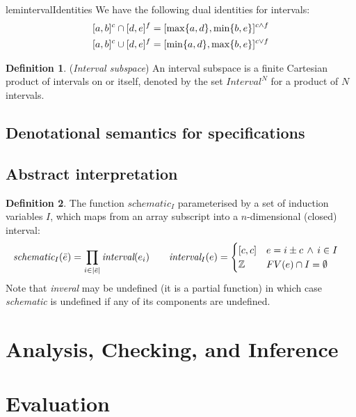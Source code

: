 \documentclass[acmlarge,review,anonymous]{acmart}\settopmatter{printfolios=true}
\theoremstyle{definition}
\newtheorem{defn}{Definition}
\theoremstyle{plain}
\begin{document}
\begin{restatable}{lem}{intervalIdentities}
 \label{lem:interval-identities}
  We have the following dual identities for \bz{} intervals:
%
  \begin{align*}
    \textnormal{$\lbrack a,b\rbrack^{c}$} \cap \textnormal{$\lbrack d,e\rbrack^{f}$} & =
      \textnormal{$\lbrack\max \{a,d\},\min \{b,e\}\rbrack^{c \wedge f}$} \\
    \textnormal{$\lbrack a,b\rbrack^{c}$} \cup \textnormal{$\lbrack d,e\rbrack^{f}$} & =
      \textnormal{$\lbrack\min \{a,d\},\max \{b,e\}\rbrack^{c \vee f}$}
  \end{align*}
\end{restatable}
%

\begin{defn}{(\emph{Interval subspace})}
  An interval subspace is a finite Cartesian product of intervals on
  \bz{} or \bz itself, 
  denoted by the set $\textit{Interval}^N$ for a product of $N$ intervals.
\end{defn}


\subsection{Denotational semantics for specifications}
\label{sec:semantics}



\subsection{Abstract interpretation}
\label{sec:fromcode}

\begin{defn}
The function $\textit{schematic}_I$ parameterised by
a set of induction variables $I$, which maps
from an array subscript into a $n$-dimensional (closed) interval:
%
\begin{align*}
\textit{schematic}_I(\bar{e}) & =
\prod_{i \in |\bar{e}|} \textit{interval}(e_i)
\qquad
\textit{interval}_I(e) = \begin{cases}
[c, c] & e = i \pm c \, \wedge \, i \in I \\
\textnormal{$\mathbb{Z}$} & FV(e) \cap I = \emptyset
\end{cases}
\end{align*}
Note that \textit{inveral} may be undefined (it is a partial function)
in which case \textit{schematic} is undefined if any of its
components are undefined.
\end{defn}



  


\section{Analysis, Checking, and Inference}

\section{Evaluation}



\appendix

\end{document}
